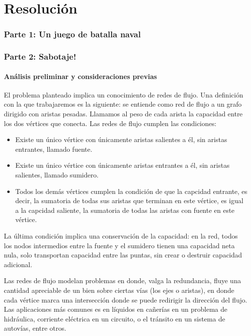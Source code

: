 \documentclass{article}
\begin{document}
\part{Resolución}
\section{Parte 1: Un juego de batalla naval}


\newpage
\section{Parte 2: Sabotaje!}

\subsection{Análisis preliminar y consideraciones previas}
El problema planteado implica un conocimiento de redes de flujo. Una definición con la que trabajaremos es la siguiente: se entiende como red de flujo a un grafo dirigido con aristas pesadas. Llamamos al peso de cada arista la capacidad entre los dos vértices que conecta. Las redes de flujo cumplen las condiciones:
\begin{itemize}
    \item Existe un único vértice con únicamente aristas salientes a él, sin aristas entrantes, llamado fuente.
    \item Existe un único vértice con únicamente aristas entrantes a él, sin aristas salientes, llamado sumidero.
    \item Todos los demás vértices cumplen la condición de que la capcidad entrante, es decir, la sumatoria de todas sus aristas que terminan en este vértice, es igual a la capcidad saliente, la sumatoria de todas las aristas con fuente en este vértice.
\end{itemize}

La última condición implica una conservación de la capacidad: en la red, todos los nodos intermedios entre la fuente y el sumidero tienen una capacidad neta nula, solo transportan capacidad entre las puntas, sin crear o destruir capacidad adicional.

Las redes de flujo modelan problemas en donde, valga la redundancia, fluye una cantidad apreciable de un bien sobre ciertas vías (los ejes o aristas), en donde cada vértice marca una intersección donde se puede redirigir la dirección del flujo. Las aplicaciones más comunes es en líquidos en cañerías en un problema de hidráulica, corriente eléctrica en un circuito, o el tránsito en un sistema de autovías, entre otros.
 
\end{document}
